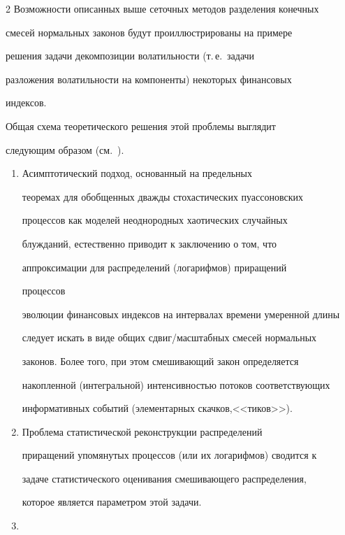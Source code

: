 \begin{multicols}{2}
Возможности описанных выше сеточных методов разделения конечных


смесей нормальных законов будут проиллюстрированы на примере


решения задачи декомпозиции волатильности (т.\,е.\ задачи


разложения волатильности на компоненты) некоторых финансовых


индексов.





Общая схема теоретического решения этой проб\-ле\-мы выглядит


следующим образом (см.~\cite{2k}).


\begin{enumerate}[($i$)]


\item Асимптотический подход, основанный на предельных


теоремах для обобщенных дважды стохастических пуассоновских


процессов как моделей неоднородных хаотических случайных


блужданий, естественно приводит к заключению о том, что


аппроксимации для распределений (логарифмов) приращений\linebreak


процессов


эволюции финансовых индексов на интервалах времени умеренной длины


следует искать в виде общих сдвиг/масштабных смесей нормальных


законов. Более \mbox{того}, при этом смешивающий закон определяется


накопленной (интегральной) интенсивностью потоков соответствующих


информативных событий (элементарных скачков,\linebreak <<тиков>>).


\item


Проблема статистической реконструкции распределений


приращений упомянутых процессов (или их логарифмов) сводится к


задаче статистического оценивания смешивающего распределения,


которое является параметром этой задачи.


\item



\end{enumerate}
\end{multicols}
